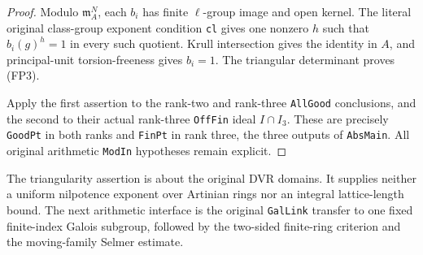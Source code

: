 \begin{proof}
Modulo $\mathfrak m_A^N$, each $b_i$ has finite $\ell$-group image
and open kernel.  The literal original class-group exponent
condition \texttt{cl} gives one nonzero $h$ such that
$b_i(g)^h=1$ in every such quotient.  Krull intersection gives the
identity in $A$, and principal-unit torsion-freeness gives $b_i=1$.
The triangular determinant proves (FP3).

Apply the first assertion to the rank-two and rank-three
\texttt{AllGood} conclusions, and the second to their actual
rank-three \texttt{OffFin} ideal $I\cap I_3$.
These are precisely \texttt{GoodPt} in both ranks and
\texttt{FinPt} in rank three, the three outputs of \texttt{AbsMain}.
All original arithmetic \texttt{ModIn} hypotheses remain explicit.
\end{proof}

The triangularity assertion is about the original DVR domains.
It supplies neither a uniform nilpotence exponent over Artinian
rings nor an integral lattice-length bound.  The next arithmetic
interface is the original \texttt{GalLink} transfer to one fixed
finite-index Galois subgroup, followed by the two-sided finite-ring
criterion and the moving-family Selmer estimate.
